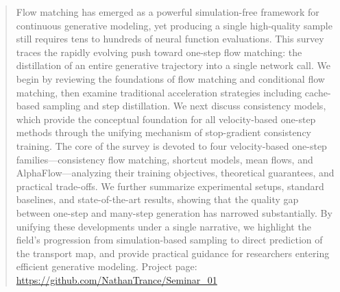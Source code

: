 \begin{abstract}
Flow matching has emerged as a powerful simulation-free framework for continuous generative modeling, yet producing a single high-quality sample still requires tens to hundreds of neural function evaluations. This survey traces the rapidly evolving push toward one-step flow matching: the distillation of an entire generative trajectory into a single network call. We begin by reviewing the foundations of flow matching and conditional flow matching, then examine traditional acceleration strategies including cache-based sampling and step distillation. We next discuss consistency models, which provide the conceptual foundation for all velocity-based one-step methods through the unifying mechanism of stop-gradient consistency training. The core of the survey is devoted to four velocity-based one-step families---consistency flow matching, shortcut models, mean flows, and AlphaFlow---analyzing their training objectives, theoretical guarantees, and practical trade-offs. We further summarize experimental setups, standard baselines, and state-of-the-art results, showing that the quality gap between one-step and many-step generation has narrowed substantially. By unifying these developments under a single narrative, we highlight the field's progression from simulation-based sampling to direct prediction of the transport map, and provide practical guidance for researchers entering efficient generative modeling. Project page: \url{https://github.com/NathanTrance/Seminar_01}
\end{abstract}


